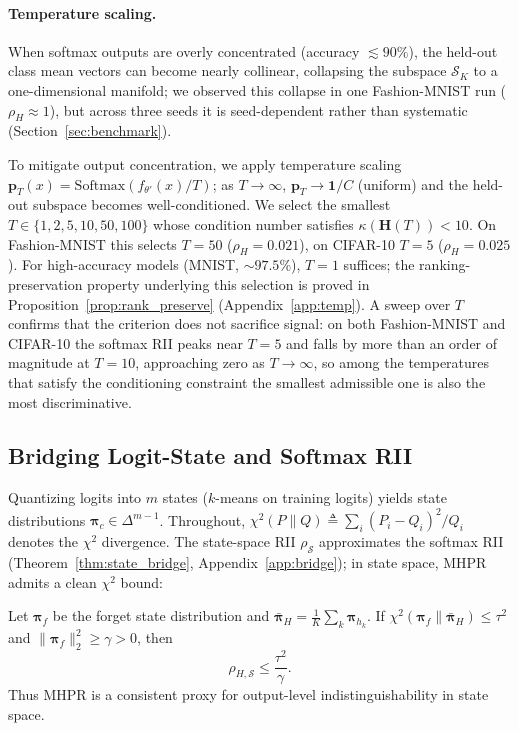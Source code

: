 \documentclass[smallextended]{svjour3}       %
\newcommand{\coloneqq}{\triangleq}
\begin{document}
\paragraph{Temperature scaling.}
When softmax outputs are overly concentrated (accuracy $\lesssim 90\%$), the held-out class mean vectors can become nearly collinear, collapsing the subspace $\mathcal{S}_K$ to a one-dimensional manifold; we observed this collapse in one Fashion-MNIST run ($\rho_H\approx1$), but across three seeds it is seed-dependent rather than systematic (Section~\ref{sec:benchmark}).

To mitigate output concentration, we apply temperature scaling $\mathbf{p}_T(x) = \mathrm{Softmax}(f_{\theta'}(x)/T)$; as $T\to\infty$, $\mathbf{p}_T \to \mathbf{1}/C$ (uniform) and the held-out subspace becomes well-conditioned. We select the smallest $T\in\{1,2,5,10,50,100\}$ whose condition number satisfies $\kappa(\mathbf{H}(T)) < 10$. On Fashion-MNIST this selects $T=50$ ($\rho_H = 0.021$), on CIFAR-10 $T=5$ ($\rho_H = 0.025$). For high-accuracy models (MNIST, $\sim97.5\%$), $T=1$ suffices; the ranking-preservation property underlying this selection is proved in Proposition~\ref{prop:rank_preserve} (Appendix~\ref{app:temp}). A sweep over $T$ confirms that the criterion does not sacrifice signal: on both Fashion-MNIST and CIFAR-10 the softmax RII peaks near $T{=}5$ and falls by more than an order of magnitude at $T{=}10$, approaching zero as $T\to\infty$, so among the temperatures that satisfy the conditioning constraint the smallest admissible one is also the most discriminative.

\subsection{Bridging Logit-State and Softmax RII}
\label{sec:logit_bridge}

Quantizing logits into $m$ states ($k$-means on training logits) yields state distributions $\boldsymbol{\pi}_c\in\Delta^{m-1}$. Throughout, $\chi^2(P\|Q)\coloneqq\sum_i (P_i-Q_i)^2/Q_i$ denotes the $\chi^2$ divergence. The state-space RII $\rho_{\mathcal{S}}$ approximates the softmax RII (Theorem~\ref{thm:state_bridge}, Appendix~\ref{app:bridge}); in state space, MHPR admits a clean $\chi^2$ bound:

\begin{theorem}
\label{thm:state_mhpr}
Let $\boldsymbol{\pi}_f$ be the forget state distribution and $\bar{\boldsymbol{\pi}}_H = \frac{1}{K}\sum_k \boldsymbol{\pi}_{h_k}$. If $\chi^2(\boldsymbol{\pi}_f \| \bar{\boldsymbol{\pi}}_H) \le \tau^2$ and $\|\boldsymbol{\pi}_f\|_2^2 \ge \gamma > 0$, then
\begin{equation}
\rho_{H,\mathcal{S}} \le \frac{\tau^2}{\gamma}.
\label{eq:state_mhpr}
\end{equation}
Thus MHPR is a consistent proxy for output-level indistinguishability in state space.
\end{theorem}
\end{document}
